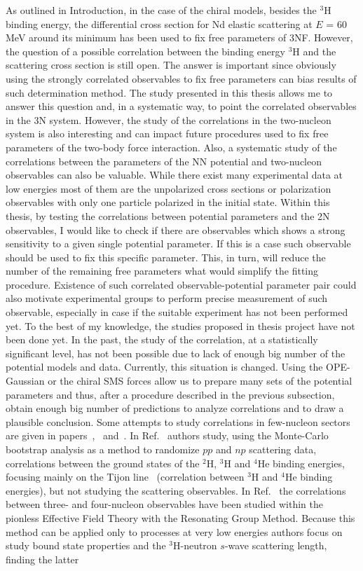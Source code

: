 As outlined in Introduction, in the case of the chiral models, besides the $^{3}$H binding energy, the differential cross section for Nd elastic scattering at $E$ = 60 MeV around its minimum has been used to fix free parameters of 3NF. However, the question of a possible correlation between the binding energy $^{3}$H and the scattering cross section is still open. The answer is important since obviously using the strongly correlated observables to fix free parameters can bias results of such determination method. The study presented in this thesis allows me to answer this question and, in a systematic way, to point the correlated observables in the 3N system. However, the study of the correlations in the two-nucleon system is also interesting and can impact future procedures used to fix free parameters of the two-body force interaction.  Also, a systematic study of the correlations between the parameters of the NN potential and two-nucleon observables can also be valuable. While there exist many experimental data at low energies most of them are the unpolarized cross sections or polarization observables with only one particle polarized in the initial state. Within this thesis, by testing the correlations between potential parameters and the 2N observables, I would like to check if there are observables which shows a strong sensitivity to a given single potential parameter. If this is a case such observable should be used to fix this specific parameter. This, in turn, will reduce the number of the remaining free parameters what would simplify the fitting procedure. Existence of such correlated observable-potential parameter pair could also motivate experimental groups to perform precise measurement of such observable, especially in case if the suitable experiment has not been performed yet. To the best of my knowledge, the studies proposed in thesis project have not been done yet. In the past, the study of the correlation, at a statistically significant level, has not been possible due to lack of enough big number of the potential models and data. Currently, this situation is changed. Using the OPE-Gaussian or the chiral SMS forces allow us to prepare many sets of the potential parameters and thus, after a procedure described in the previous subsection, obtain enough big number of predictions to analyze correlations and to draw a plausible conclusion. Some attempts to study correlations in few-nucleon sectors are given in papers~\cite{Perez2016},~\cite{kirscher2010universal} and~\cite{kievsky2018correlations}. In Ref.~\cite{Perez2016} authors study, using the Monte-Carlo bootstrap analysis as a method to randomize $pp$ and $np$ scattering data, correlations between the ground states of the $^{2}$H, $^{3}$H and $^{4}$He binding energies, focusing mainly on the Tijon line~\cite{TJON1975217} (correlation between $^{3}$H and $^{4}$He binding energies), but not studying the scattering observables. In Ref.~\cite{kirscher2010universal} the correlations between three- and four-nucleon observables have been studied within the pionless Effective Field Theory with the Resonating Group Method. Because this method can be applied only to processes at very low energies authors focus on study bound state properties and the $^{3}$H-neutron $s$-wave scattering length, finding the latter 
